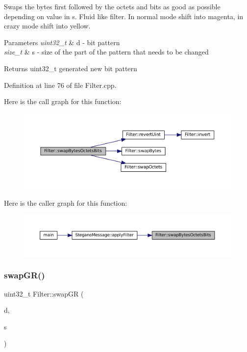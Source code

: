Swaps the bytes first followed by the octets and bits as good as possible depending on value in s. Fluid like filter. In normal mode shift into magenta, in crazy mode shift into yellow. 


\begin{DoxyParams}{Parameters}
{\em uint32\+\_\+t} & d -\/ bit pattern \\
\hline
{\em size\+\_\+t} & s -\/ size of the part of the pattern that needs to be changed \\
\hline
\end{DoxyParams}
\begin{DoxyReturn}{Returns}
uint32\+\_\+t generated new bit pattern 
\end{DoxyReturn}


Definition at line 76 of file Filter.\+cpp.

Here is the call graph for this function\+:\nopagebreak
\begin{figure}[H]
\begin{center}
\leavevmode
\includegraphics[width=350pt]{classFilter_a9c8e2eb790e7e9dff6493a12a1fefc4f_cgraph}
\end{center}
\end{figure}
Here is the caller graph for this function\+:
\nopagebreak
\begin{figure}[H]
\begin{center}
\leavevmode
\includegraphics[width=350pt]{classFilter_a9c8e2eb790e7e9dff6493a12a1fefc4f_icgraph}
\end{center}
\end{figure}
\mbox{\label{classFilter_ad6f109289f21be75db0a1351c86d3143}} 
\subsubsection{\texorpdfstring{swapGR()}{swapGR()}}
{\footnotesize\ttfamily uint32\+\_\+t Filter\+::swap\+GR (\begin{DoxyParamCaption}\item[{uint32\+\_\+t}]{d,  }\item[{size\+\_\+t}]{s }\end{DoxyParamCaption})\hspace{0.3cm}{\ttfamily [static]}}



